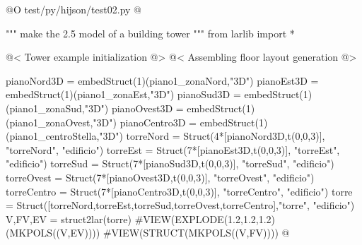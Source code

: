 \documentclass[11pt,oneside]{article}    %
\begin{document}
@O test/py/hijson/test02.py
@{""" make the 2.5 model of a building tower """
from larlib import *

@< Tower example initialization @>
@< Assembling floor layout generation @>

pianoNord3D = embedStruct(1)(piano1_zonaNord,"3D")
pianoEst3D = embedStruct(1)(piano1_zonaEst,"3D")
pianoSud3D = embedStruct(1)(piano1_zonaSud,"3D")
pianoOvest3D = embedStruct(1)(piano1_zonaOvest,"3D")
pianoCentro3D = embedStruct(1)(piano1_centroStella,"3D")
torreNord = Struct(4*[pianoNord3D,t(0,0,3)], "torreNord", "edificio")
torreEst = Struct(7*[pianoEst3D,t(0,0,3)], "torreEst", "edificio")
torreSud = Struct(7*[pianoSud3D,t(0,0,3)], "torreSud", "edificio")
torreOvest = Struct(7*[pianoOvest3D,t(0,0,3)], "torreOvest", "edificio")
torreCentro = Struct(7*[pianoCentro3D,t(0,0,3)], "torreCentro", "edificio")
torre = Struct([torreNord,torreEst,torreSud,torreOvest,torreCentro],"torre", "edificio")
V,FV,EV = struct2lar(torre)
#VIEW(EXPLODE(1.2,1.2,1.2)(MKPOLS((V,EV))))
#VIEW(STRUCT(MKPOLS((V,FV))))
@}




\end{document}
